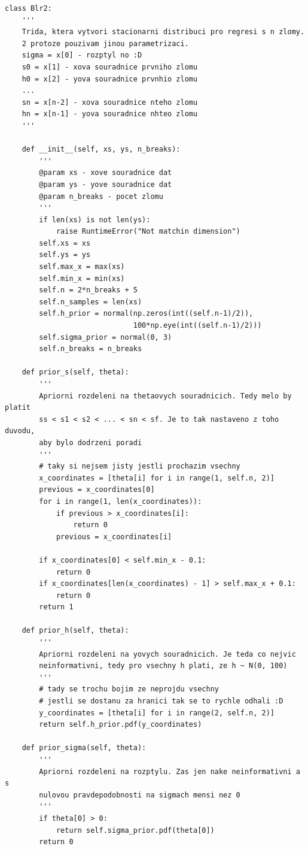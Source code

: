 \documentclass[czech,master,public,dept470,male,cpdeclaration,oneside, python]{diploma}
\begin{document}
\begin{lstlisting}[caption=implementace aposteriorního rozdělení pro po částech lineární regresi]
class Blr2:
    '''
    Trida, ktera vytvori stacionarni distribuci pro regresi s n zlomy.
    2 protoze pouzivam jinou parametrizaci.
    sigma = x[0] - rozptyl no :D
    s0 = x[1] - xova souradnice prvniho zlomu
    h0 = x[2] - yova souradnice prvnhio zlomu
    ...
    sn = x[n-2] - xova souradnice nteho zlomu
    hn = x[n-1] - yova souradnice nhteo zlomu
    '''

    def __init__(self, xs, ys, n_breaks):
        '''
        @param xs - xove souradnice dat
        @param ys - yove souradnice dat
        @param n_breaks - pocet zlomu
        '''
        if len(xs) is not len(ys):
            raise RuntimeError("Not matchin dimension")
        self.xs = xs
        self.ys = ys
        self.max_x = max(xs)
        self.min_x = min(xs)
        self.n = 2*n_breaks + 5
        self.n_samples = len(xs)
        self.h_prior = normal(np.zeros(int((self.n-1)/2)),
                              100*np.eye(int((self.n-1)/2)))
        self.sigma_prior = normal(0, 3)
        self.n_breaks = n_breaks
        
    def prior_s(self, theta):
        '''
        Apriorni rozdeleni na thetaovych souradnicich. Tedy melo by platit
        ss < s1 < s2 < ... < sn < sf. Je to tak nastaveno z toho duvodu,
        aby bylo dodrzeni poradi
        '''
        # taky si nejsem jisty jestli prochazim vsechny
        x_coordinates = [theta[i] for i in range(1, self.n, 2)]
        previous = x_coordinates[0]
        for i in range(1, len(x_coordinates)):
            if previous > x_coordinates[i]:
                return 0
            previous = x_coordinates[i]

        if x_coordinates[0] < self.min_x - 0.1:
            return 0
        if x_coordinates[len(x_coordinates) - 1] > self.max_x + 0.1:
            return 0
        return 1

    def prior_h(self, theta):
        '''
        Apriorni rozdeleni na yovych souradnicich. Je teda co nejvic
        neinformativni, tedy pro vsechny h plati, ze h ~ N(0, 100)
        '''
        # tady se trochu bojim ze neprojdu vsechny
        # jestli se dostanu za hranici tak se to rychle odhali :D
        y_coordinates = [theta[i] for i in range(2, self.n, 2)]
        return self.h_prior.pdf(y_coordinates)

    def prior_sigma(self, theta):
        '''
        Apriorni rozdeleni na rozptylu. Zas jen nake neinformativni a s
        nulovou pravdepodobnosti na sigmach mensi nez 0
        '''
        if theta[0] > 0:
            return self.sigma_prior.pdf(theta[0])
        return 0


\end{lstlisting}
\end{document}
